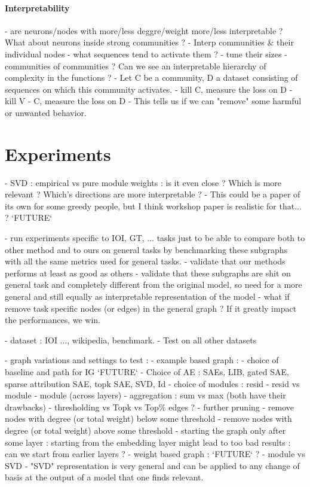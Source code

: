 \documentclass{article}
\begin{document}
\paragraph{Interpretability}

- are neurons/nodes with more/less deggre/weight more/less interpretable ? What about neurons inside strong communities ?
- Interp communities & their individual nodes
    - what sequences tend to activate them ?
    - tune their sizes
    - communities of communities ? Can we see an interpretable hierarchy of complexity in the functions ?
- Let C be a community, D a dataset consisting of sequences on which this community activates.
    - kill C, measure the loss on D
    - kill V - C, measure the loss on D
    - This tells us if we can "remove" some harmful or unwanted behavior.

\section{Experiments}

- SVD : empirical vs pure module weights : is it even close ? Which is more relevant ? Which's directions are more interpretable ?
    - This could be a paper of its own for some greedy people, but I think workshop paper is realistic for that... ? `FUTURE`

- run experiments specific to IOI, GT, ... tasks just to be able to compare both to other method and to ours on general tasks by benchmarking these subgraphs with all the same metrics used for general tasks.
    - validate that our methods performs at least as good as others
    - validate that these subgraphs are shit on general task and completely different from the original model, so need for a more general and still equally as interpretable representation of the model
    - what if remove task specific nodes (or edges) in the general graph ? If it greatly impact the performances, we win.

- dataset : IOI ..., wikipedia, benchmark.
    - Test on all other datasets

- graph variations and settings to test :
    - example based graph :
        - choice of baseline and path for IG `FUTURE`
        - Choice of AE : SAEs, LIB, gated SAE, sparse attribution SAE, topk SAE, SVD, Id
        - choice of modules : resid - resid vs module - module (across layers)
        - aggregation : sum vs max (both have their drawbacks)
        - thresholding vs Topk vs Top$\%$ edges ?
        - further pruning
            - remove nodes with degree (or total weight) below some threshold
            - remove nodes with degree (or total weight) above some threshold
            - starting the graph only after some layer : starting from the embedding layer might lead to too bad results : can we start from earlier layers ?
    - weight based graph :
    `FUTURE` ?
        - module vs SVD
            - "SVD" representation is very general and can be applied to any change of basis at the output of a model that one finds relevant.
\end{document}
